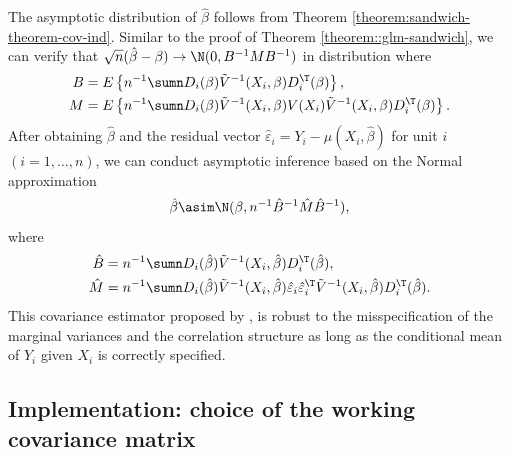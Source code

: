 The asymptotic distribution of $\hat{\beta}$ follows from Theorem \ref{theorem:sandwich-theorem-cov-ind}. Similar to the proof of Theorem \ref{theorem::glm-sandwich}, we can verify that $\sqrt{n}(\hat{\beta}-\beta)\rightarrow\N(0,B^{-1}MB^{-1})$
in distribution where
\begin{align*}
B & =E\left\{ n^{-1}\sumn  D_{i} (\beta)\tilde{V}^{-1}(X_{i}, \beta)D_{i}^{\T}(\beta)\right\} ,\\
M & =E\left\{ n^{-1}\sumn D_{i} (\beta)\tilde{V}^{-1}(X_{i}, \beta)V(X_{i})\tilde{V}^{-1}(X_{i}, \beta)D_{i}^{\T}(\beta)\right\} .
\end{align*}
After obtaining $\hat{\beta}$ and the residual vector $\hat{\varepsilon}_{i}=Y_{i}-\mu(X_{i},\hat{\beta})$
for unit $i$ $(i=1,\ldots,n)$, we can conduct asymptotic inference
based on the Normal approximation 
\[
\hat{\beta}\asim\N(\beta,n^{-1}\hat{B}^{-1}\hat{M}\hat{B}^{-1}),
\]
where 
\begin{align*}
\hat{B} & =n^{-1}\sumn D_{i} (\hat{\beta})\tilde{V}^{-1}(X_{i}, \hat{\beta})D_{i}^{\T}(\hat{\beta}),\\
\hat{M} & =n^{-1}\sumn D_{i} (\hat{\beta})\tilde{V}^{-1}(X_{i}, \hat{\beta})\hat{\varepsilon}_{i}\hat{\varepsilon}_{i}^{\T}\tilde{V}^{-1}(X_{i}, \hat{\beta})D_{i}^{\T}(\hat{\beta}).
\end{align*}
This covariance estimator proposed by \citet{liang1986longitudinal}, is robust to the misspecification of the marginal variances and the correlation structure as long as the conditional mean of $Y_i$ given $X_i$ is correctly specified.  




\subsection{Implementation: choice of the working covariance matrix}

